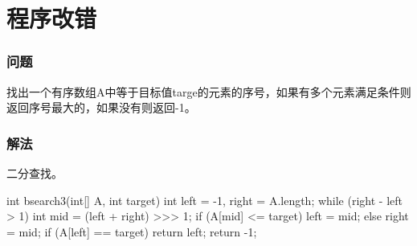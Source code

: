 \section{程序改错} %
\label{sec:debug-code}


\subsubsection{问题}
找出一个有序数组A中等于目标值targe的元素的序号，如果有多个元素满足条件则返回序号最大的，如果没有则返回-1。

\subsubsection{解法}
二分查找。

\begin{Codex}[label={[$O(lg(N))+O(1)$]Chap03_11_DebugCode.java}]
int bsearch3(int[] A, int target) {
	int left = -1, right = A.length;
	while (right - left > 1) {
		int mid = (left + right) >>> 1;
		if (A[mid] <= target) {
			left = mid;
		} else {
			right = mid;
		}
	}
	if (A[left] == target) {
		return left;
	}
	return -1;
}
\end{Codex}